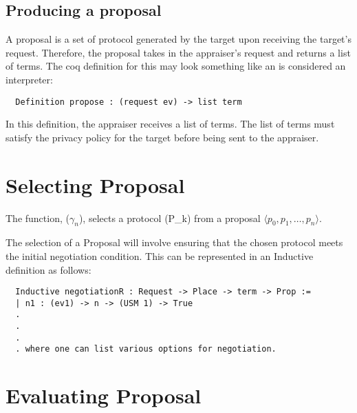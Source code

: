 \documentclass[10pt]{article}
\begin{document}
\subsection {Producing a proposal}

  A proposal is a set of protocol generated by the target upon receiving the target's request. Therefore, the proposal takes in the appraiser's request and returns a list of terms. The coq definition for this may look something like an is considered an interpreter: 
  
  \begin{verbatim}
  Definition propose : (request ev) -> list term
  \end{verbatim}  
  
  In this definition, the appraiser receives a list of terms. The list of terms must satisfy the privacy policy for the target before being sent to the appraiser. 

\section {Selecting Proposal}

  The function, ($\gamma_{n}$), selects a protocol (P_{k}) 
  from a proposal $\langle p_0,p_1,\ldots,p_n\rangle$.  

  The selection of a Proposal will involve ensuring that the chosen protocol meets the initial negotiation condition. This can be represented in an Inductive definition as follows:
  
  \begin{verbatim}
  Inductive negotiationR : Request -> Place -> term -> Prop :=
  | n1 : (ev1) -> n -> (USM 1) -> True
  .
  .
  .
  . where one can list various options for negotiation. 
  \end{verbatim} 
  
  
  
\section {Evaluating Proposal}
\end{document}
